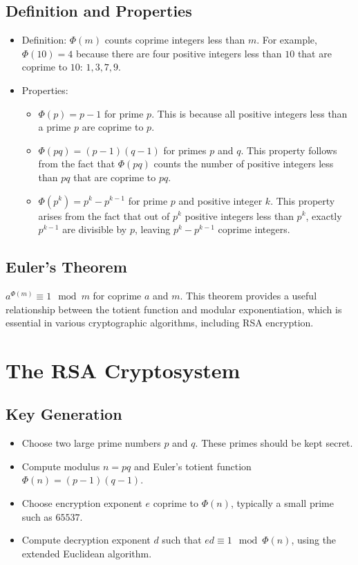 \documentclass[11pt]{article}
\begin{document}
\subsection{Definition and Properties}
\begin{itemize}
    \item Definition: $\Phi(m)$ counts coprime integers less than $m$. For example, $\Phi(10) = 4$ because there are four positive integers less than $10$ that are coprime to $10$: $1, 3, 7, 9$.
    \item Properties:
    \begin{itemize}
        \item $\Phi(p) = p - 1$ for prime $p$. This is because all positive integers less than a prime $p$ are coprime to $p$.
        \item $\Phi(pq) = (p - 1)(q - 1)$ for primes $p$ and $q$. This property follows from the fact that $\Phi(pq)$ counts the number of positive integers less than $pq$ that are coprime to $pq$.
        \item $\Phi(p^k) = p^k - p^{k-1}$ for prime $p$ and positive integer $k$. This property arises from the fact that out of $p^k$ positive integers less than $p^k$, exactly $p^{k-1}$ are divisible by $p$, leaving $p^k - p^{k-1}$ coprime integers.
    \end{itemize}
\end{itemize}

\subsection{Euler’s Theorem}
$a^{\Phi(m)} \equiv 1 \mod m$ for coprime $a$ and $m$. This theorem provides a useful relationship between the totient function and modular exponentiation, which is essential in various cryptographic algorithms, including RSA encryption.

\section{The RSA Cryptosystem}
\subsection{Key Generation}
\begin{itemize}
    \item Choose two large prime numbers $p$ and $q$. These primes should be kept secret.
    \item Compute modulus $n = pq$ and Euler’s totient function $\Phi(n) = (p - 1)(q - 1)$.
    \item Choose encryption exponent $e$ coprime to $\Phi(n)$, typically a small prime such as $65537$.
    \item Compute decryption exponent $d$ such that $ed \equiv 1 \mod \Phi(n)$, using the extended Euclidean algorithm.
\end{itemize}
\end{document}
